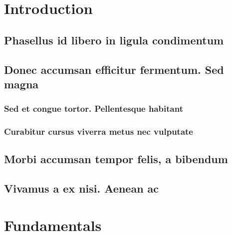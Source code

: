 \documentclass[%
  bachelor,%
  english%
  oneside,%
  debug,%
]{student}
\begin{document}
\tableofcontents

\listoffigures

\listoftables

\listoftodos

\mainmatter


\chapter{Introduction}

\section{Phasellus id libero in ligula condimentum}

\lipsum[1-8]

\section{Donec accumsan efficitur fermentum. Sed magna}

\lipsum[1-8]

\subsection{Sed et congue tortor. Pellentesque habitant}

\lipsum[1-8]

\subsection{Curabitur cursus viverra metus nec vulputate}

\lipsum[1-8]

\section{Morbi accumsan tempor felis, a bibendum}

\lipsum[1-8]

\section{Vivamus a ex nisi. Aenean ac}

\lipsum[1-8]



\chapter{Fundamentals}
\end{document}
